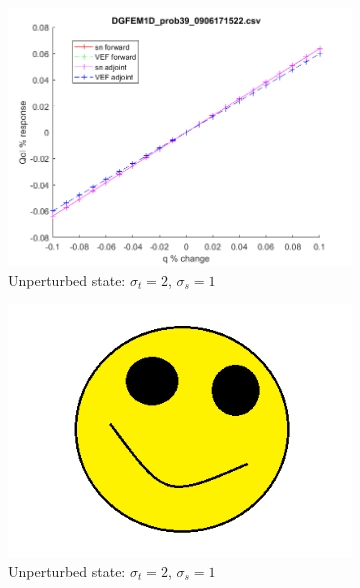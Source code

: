 \documentclass[12pt]{report}
\newcommand{\sigt}{\sigma_t}
\newcommand{\sigs}{\sigma_s}
\begin{document}
\begin{figure}[H]
\label{InHomoPertq}
\centering
\begin{subfigure}{.5\textwidth}
  \centering
  \includegraphics[width=.98\linewidth]{figures/39qSens.png}
  \caption{Unperturbed state: $\sigt=2$, $\sigs=1$}
  \label{fig:sfig1}
\end{subfigure}%
\begin{subfigure}{.5\textwidth}
  \centering
  \includegraphics[width=.98\linewidth]{figures/holder.png}
  \caption{Unperturbed state: $\sigt=2$, $\sigs=1$}
  \label{fig:sfig4}
\end{subfigure}%
\\
\begin{subfigure}{.5\textwidth}
  \centering

\end{subfigure}
\end{figure}
\end{document}
